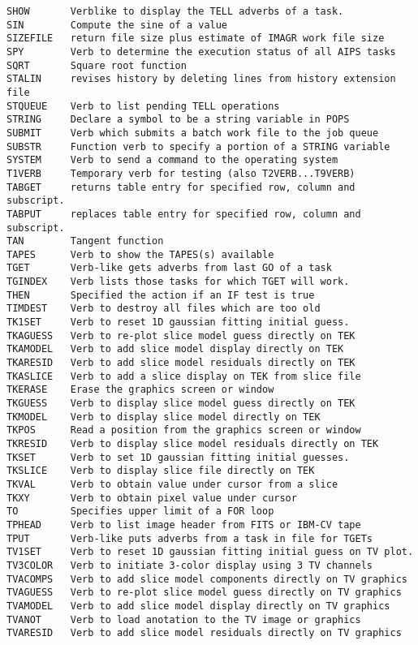 \begin{verbatim}
SHOW       Verblike to display the TELL adverbs of a task.
SIN        Compute the sine of a value
SIZEFILE   return file size plus estimate of IMAGR work file size
SPY        Verb to determine the execution status of all AIPS tasks
SQRT       Square root function
STALIN     revises history by deleting lines from history extension file
STQUEUE    Verb to list pending TELL operations
STRING     Declare a symbol to be a string variable in POPS
SUBMIT     Verb which submits a batch work file to the job queue
SUBSTR     Function verb to specify a portion of a STRING variable
SYSTEM     Verb to send a command to the operating system
T1VERB     Temporary verb for testing (also T2VERB...T9VERB)
TABGET     returns table entry for specified row, column and subscript.
TABPUT     replaces table entry for specified row, column and subscript.
TAN        Tangent function
TAPES      Verb to show the TAPES(s) available
TGET       Verb-like gets adverbs from last GO of a task
TGINDEX    Verb lists those tasks for which TGET will work.
THEN       Specified the action if an IF test is true
TIMDEST    Verb to destroy all files which are too old
TK1SET     Verb to reset 1D gaussian fitting initial guess.
TKAGUESS   Verb to re-plot slice model guess directly on TEK
TKAMODEL   Verb to add slice model display directly on TEK
TKARESID   Verb to add slice model residuals directly on TEK
TKASLICE   Verb to add a slice display on TEK from slice file
TKERASE    Erase the graphics screen or window
TKGUESS    Verb to display slice model guess directly on TEK
TKMODEL    Verb to display slice model directly on TEK
TKPOS      Read a position from the graphics screen or window
TKRESID    Verb to display slice model residuals directly on TEK
TKSET      Verb to set 1D gaussian fitting initial guesses.
TKSLICE    Verb to display slice file directly on TEK
TKVAL      Verb to obtain value under cursor from a slice
TKXY       Verb to obtain pixel value under cursor
TO         Specifies upper limit of a FOR loop
TPHEAD     Verb to list image header from FITS or IBM-CV tape
TPUT       Verb-like puts adverbs from a task in file for TGETs
TV1SET     Verb to reset 1D gaussian fitting initial guess on TV plot.
TV3COLOR   Verb to initiate 3-color display using 3 TV channels
TVACOMPS   Verb to add slice model components directly on TV graphics
TVAGUESS   Verb to re-plot slice model guess directly on TV graphics
TVAMODEL   Verb to add slice model display directly on TV graphics
TVANOT     Verb to load anotation to the TV image or graphics
TVARESID   Verb to add slice model residuals directly on TV graphics

\end{verbatim}
